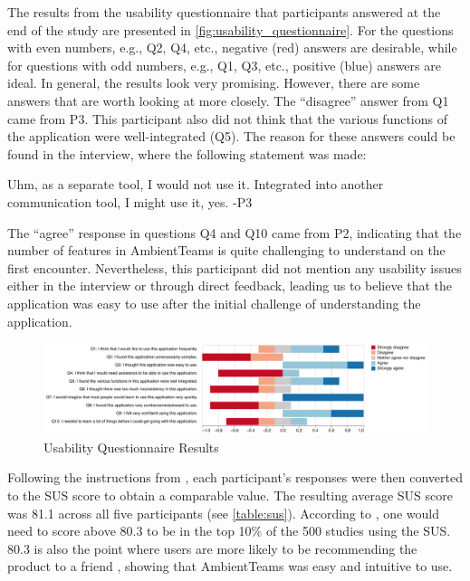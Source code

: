 The results from the usability questionnaire that participants answered at the end of the study are presented in \autoref{fig:usability_questionnaire}. For the questions with even numbers, e.g., Q2, Q4, etc., negative (red) answers are desirable, while for questions with odd numbers, e.g., Q1, Q3, etc., positive (blue) answers are ideal. In general, the results look very promising. However, there are some answers that are worth looking at more closely. The \enquote{disagree} answer from Q1 came from P3. This participant also did not think that the various functions of the application were well-integrated (Q5). The reason for these answers could be found in the interview, where the following statement was made:

\begin{displayquote}
    Uhm, as a separate tool, I would not use it. Integrated into another communication tool, I might use it, yes. -P3
\end{displayquote}

The \enquote{agree} response in questions Q4 and Q10 came from P2, indicating that the number of features in AmbientTeams is quite challenging to understand on the first encounter. Nevertheless, this participant did not mention any usability issues either in the interview or through direct feedback, leading us to believe that the application was easy to use after the initial challenge of understanding the application.

\begin{figure}[h]
    \centering
    \includegraphics[width=\linewidth]{plots/usability_likert.pdf}
    \caption{Usability Questionnaire Results}
    \label{fig:usability_questionnaire}
\end{figure}

Following the instructions from \textcite{sauroSUS}, each participant's responses were then converted to the SUS score to obtain a comparable value. The resulting average SUS score was 81.1 across all five participants (see \autoref{table:sus}). According to \textcite{sauroSUS}, one would need to score above 80.3 to be in the top 10\% of the 500 studies using the SUS. 80.3 is also the point where users are more likely to be recommending the product to a friend \autocite{sauroSUS}, showing that AmbientTeams was easy and intuitive to use.

